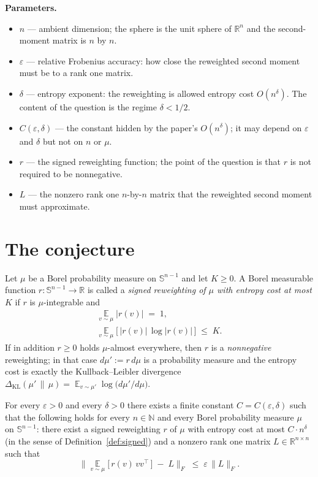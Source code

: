 \documentclass{conjura-conjecture}
\newcommand{\Expect}{\operatorname*{\mathbb{E}}}
\newcommand{\Sph}{\mathbb{S}^{n-1}}
\newcommand{\Reals}{\mathbb{R}}
\newcommand{\Nat}{\mathbb{N}}
\newcommand{\KL}{\Delta_{\mathrm{KL}}}
\begin{document}
\textbf{Parameters.}
\begin{itemize}[leftmargin=1.2em]
\item $n$ --- ambient dimension; the sphere is the unit sphere of
  $\Reals^{n}$ and the second-moment matrix is $n$ by $n$.
\item $\varepsilon$ --- relative Frobenius accuracy: how close the
  reweighted second moment must be to a rank one matrix.
\item $\delta$ --- entropy exponent: the reweighting is allowed
  entropy cost $O(n^{\delta})$. The content of the question is the
  regime $\delta < 1/2$.
\item $C(\varepsilon, \delta)$ --- the constant hidden by the paper's
  $O(n^{\delta})$; it may depend on $\varepsilon$ and $\delta$ but not
  on $n$ or $\mu$.
\item $r$ --- the signed reweighting function; the point of the
  question is that $r$ is not required to be nonnegative.
\item $L$ --- the nonzero rank one $n$-by-$n$ matrix that the
  reweighted second moment must approximate.
\end{itemize}

\section{The conjecture}\label{sec:conjectures}

\begin{definition}\label{def:signed}
Let $\mu$ be a Borel probability measure on $\Sph$ and let $K \ge 0$.
A Borel measurable function $r : \Sph \to \Reals$ is called a
\emph{signed reweighting of $\mu$ with entropy cost at most $K$} if
$r$ is $\mu$-integrable and
\[
\begin{gathered}
  \Expect_{v \sim \mu} \big| r(v) \big| \;=\; 1, \\[0.25em]
  \Expect_{v \sim \mu} \Big[\, \big| r(v) \big| \,
    \log \big| r(v) \big| \,\Big] \;\le\; K .
\end{gathered}
\]
If in addition $r \ge 0$ holds $\mu$-almost everywhere, then $r$ is a
\emph{nonnegative} reweighting; in that case $d\mu' := r \, d\mu$ is a
probability measure and the entropy cost is exactly the
Kullback--Leibler divergence $\KL(\mu' \,\|\, \mu) = \Expect_{v \sim
\mu'} \log\big( d\mu'/d\mu \big)$.
\end{definition}

\begin{conjecture}\label{conj:main}
For every $\varepsilon > 0$ and every $\delta > 0$ there exists a
finite constant $C = C(\varepsilon, \delta)$ such that the following
holds for every $n \in \Nat$ and every Borel probability measure $\mu$
on $\Sph$: there exist a signed reweighting $r$ of $\mu$ with entropy
cost at most $C \cdot n^{\delta}$ (in the sense of
Definition~\ref{def:signed}) and a nonzero rank one matrix $L \in
\Reals^{n \times n}$ such that
\[
  \Big\| \Expect_{v \sim \mu}\big[\, r(v)\, v v^{\top} \,\big]
    \;-\; L \Big\|_{F} \;\le\; \varepsilon \, \|L\|_{F}.
\]
\end{conjecture}
\end{document}
